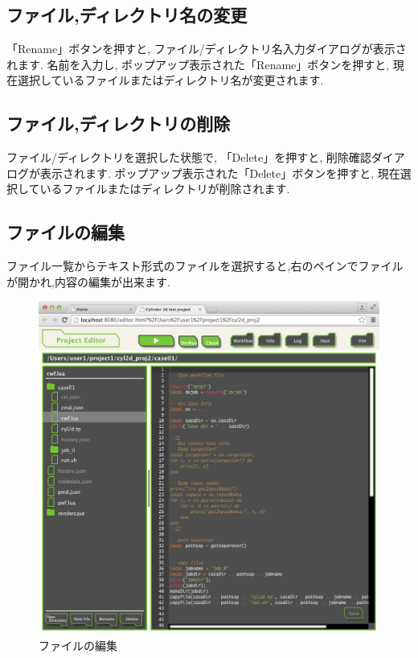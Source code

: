 \documentclass[a4paper,10pt,oneside]{jsbook}
\begin{document}
\subsection{ファイル,ディレクトリ名の変更}
「Rename」ボタンを押すと, ファイル/ディレクトリ名入力ダイアログが表示されます. 名前を入力し, ポップアップ表示された「Rename」ボタンを押すと, 現在選択しているファイルまたはディレクトリ名が変更されます.

\subsection{ファイル,ディレクトリの削除}
ファイル/ディレクトリを選択した状態で, 「Delete」を押すと, 削除確認ダイアログが表示されます. ポップアップ表示された「Delete」ボタンを押すと, 現在選択しているファイルまたはディレクトリが削除されます.

\subsection{ファイルの編集}
ファイル一覧からテキスト形式のファイルを選択すると,右のペインでファイルが開かれ,内容の編集が出来ます.

\begin{figure}[H]
	\begin{center}
		\includegraphics[width=12.0cm]{image/projeditor_003.png}
	\end{center}
	\caption{ファイルの編集}
	\label{fig:projeditor_edit}
\end{figure}
\end{document}
